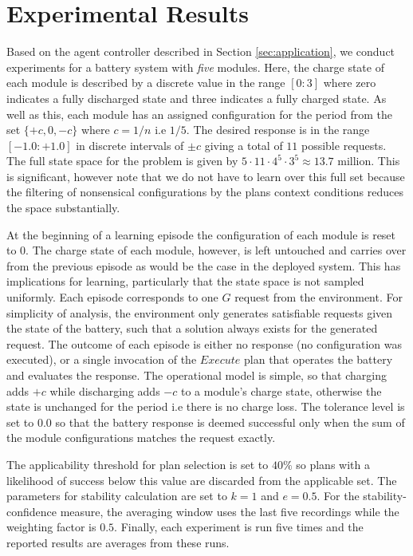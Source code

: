 \section{Experimental Results}\label{sec:results}

Based on the agent controller described in Section \ref{sec:application}, we conduct experiments for a battery system with {\em five} modules. Here, the charge state of each module is described by a discrete value in the range $[0:3]$ where zero indicates a fully discharged state and three indicates a fully charged state. As well as this, each module has an assigned configuration for the period from the set $\{+c, 0, -c\}$ where $c=1/n$ i.e $1/5$. The desired response is in the range $[-1.0:+1.0]$ in discrete intervals of $\pm c$ giving a total of $11$ possible requests. The full state space for the problem is given by $5 \cdot 11 \cdot 4^5 \cdot 3^5 \approx 13.7$ million. This is significant, however note that we do not have to learn over this full set because the filtering of nonsensical configurations by the plans context conditions reduces the space substantially.

At the beginning of a learning episode the configuration of each module is reset to $0$. The charge state of each module, however, is left untouched and carries over from the previous episode as would be the case in the deployed system. This has implications for learning, particularly that the state space is not sampled uniformly. Each episode corresponds to one $G$ request from the environment. For simplicity of analysis, the environment only generates satisfiable requests given the state of the battery, such that a solution always exists for the generated request. The outcome of each episode is either no response (no configuration was executed), or a single invocation of the $Execute$ plan that operates the battery and evaluates the response. The operational model is simple, so that charging adds $+c$ while discharging adds $-c$ to a module's charge state, otherwise the state is unchanged for the period i.e there is no charge loss. The tolerance level is set to $0.0$ so that the battery response is deemed successful only when the sum of the module configurations matches the request exactly.

The applicability threshold for plan selection is set to $40\%$ so plans with a likelihood of success below this value are discarded from the applicable set. The parameters for stability calculation are set to $k=1$ and $e=0.5$. For the stability-confidence measure, the averaging window uses the last five recordings while the weighting factor is $0.5$. Finally, each experiment is run five times and the reported results are averages from these runs.

